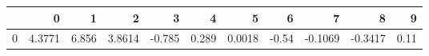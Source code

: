 \begin{tabular}{lrrrrrrrrrr}
\toprule
{} &       0 &      1 &       2 &      3 &      4 &       5 &     6 &       7 &       8 &     9 \\
\midrule
0 &  4.3771 &  6.856 &  3.8614 & -0.785 &  0.289 &  0.0018 & -0.54 & -0.1069 & -0.3417 &  0.11 \\
\bottomrule
\end{tabular}
